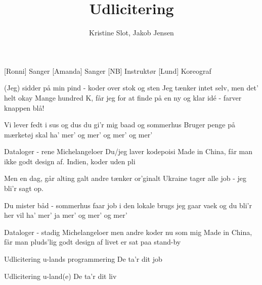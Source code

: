 \documentclass[a4paper,11pt]{article}
\title{Udlicitering}
\author{Kristine Slot, Jakob Jensen}
\begin{document}
\maketitle

\begin{roles}
  [Ronni] Sanger
  [Amanda] Sanger
  [NB] Instruktør
  [Lund] Koreograf
\end{roles}


\begin{song}

  (Jeg) sidder på min pind - koder over stok og sten
  Jeg tænker intet selv, men det' helt okay
  Mange hundred K, får jeg for at finde på
  en ny og klar idé - farver knappen blå!

  Vi lever fedt i sus og dus
  du gi'r mig baad og sommerhus
  Bruger penge på mærketøj
  skal ha' mer' og mer' og mer' og mer'

  Dataloger - rene Michelangeloer
  Du/jeg laver kodepoisi
  Made in China, får man ikke godt design af.
  Indien, koder uden pli

  Men en dag, går alting galt
  andre tænker or'ginalt
  Ukraine tager alle job
  - jeg bli'r sagt op.

  Du mister b\aa d - sommerhus
  faar job i den lokale brugs
  jeg gaar vaek og du bli'r her
  vil ha' mer' ja mer' og mer' og mer'

  Dataloger - stadig Michelangeloer
  men andre koder nu som mig
  Made in China, får man pluds'lig godt design af
  livet er sat paa stand-by

  Udlicitering
  u-lands programmering
  De ta'r dit job

  Udlicitering
  u-land(e)
  De ta'r dit liv

\end{song}
\end{document}
